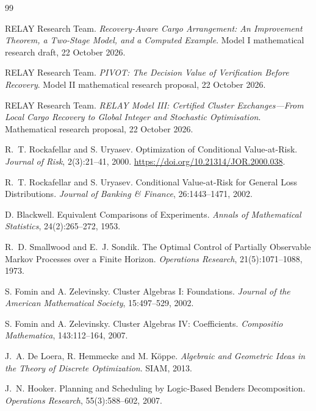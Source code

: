 \documentclass[10pt,a4paper]{article}
\theoremstyle{plain}
\theoremstyle{definition}
\theoremstyle{remark}
\begin{document}
\begin{thebibliography}{99}

RELAY Research Team.
\newblock
\emph{Recovery-Aware Cargo Arrangement:
An Improvement Theorem, a Two-Stage Model,
and a Computed Example}.
\newblock
Model I mathematical research draft,
22 October 2026.

RELAY Research Team.
\newblock
\emph{PIVOT:
The Decision Value of Verification Before Recovery}.
\newblock
Model II mathematical research proposal,
22 October 2026.

RELAY Research Team.
\newblock
\emph{RELAY Model III:
Certified Cluster Exchanges---From Local Cargo Recovery
to Global Integer and Stochastic Optimisation}.
\newblock
Mathematical research proposal,
22 October 2026.

R.~T. Rockafellar and S. Uryasev.
\newblock
Optimization of Conditional Value-at-Risk.
\newblock
\emph{Journal of Risk},
2(3):21--41, 2000.
\newblock
\url{https://doi.org/10.21314/JOR.2000.038}.

R.~T. Rockafellar and S. Uryasev.
\newblock
Conditional Value-at-Risk for General Loss Distributions.
\newblock
\emph{Journal of Banking \& Finance},
26:1443--1471, 2002.

D. Blackwell.
\newblock
Equivalent Comparisons of Experiments.
\newblock
\emph{Annals of Mathematical Statistics},
24(2):265--272, 1953.

R.~D. Smallwood and E.~J. Sondik.
\newblock
The Optimal Control of Partially Observable
Markov Processes over a Finite Horizon.
\newblock
\emph{Operations Research},
21(5):1071--1088, 1973.

S. Fomin and A. Zelevinsky.
\newblock
Cluster Algebras I: Foundations.
\newblock
\emph{Journal of the American Mathematical Society},
15:497--529, 2002.

S. Fomin and A. Zelevinsky.
\newblock
Cluster Algebras IV: Coefficients.
\newblock
\emph{Compositio Mathematica},
143:112--164, 2007.

J.~A. De Loera, R. Hemmecke and M. K\"oppe.
\newblock
\emph{Algebraic and Geometric Ideas
in the Theory of Discrete Optimization}.
\newblock
SIAM, 2013.

J.~N. Hooker.
\newblock
Planning and Scheduling by
Logic-Based Benders Decomposition.
\newblock
\emph{Operations Research},
55(3):588--602, 2007.


\end{thebibliography}
\end{document}
